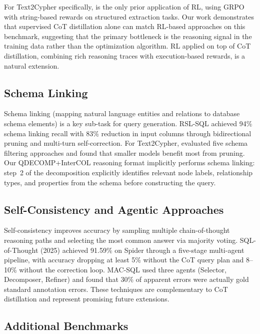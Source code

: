 \documentclass[11pt]{article}
\begin{document}
For Text2Cypher specifically, \citet{tran2025refining} is the only prior application of RL, using GRPO with string-based rewards on structured extraction tasks. Our work demonstrates that supervised CoT distillation alone can match RL-based approaches on this benchmark, suggesting that the primary bottleneck is the reasoning signal in the training data rather than the optimization algorithm. RL applied on top of CoT distillation, combining rich reasoning traces with execution-based rewards, is a natural extension.

\subsection{Schema Linking}

Schema linking (mapping natural language entities and relations to database schema elements) is a key sub-task for query generation. RSL-SQL \citep{rslsql2024} achieved 94\% schema linking recall with 83\% reduction in input columns through bidirectional pruning and multi-turn self-correction. For Text2Cypher, \citet{ozsoy2025schema} evaluated five schema filtering approaches and found that smaller models benefit most from pruning. Our QDECOMP+InterCOL reasoning format implicitly performs schema linking: step~2 of the decomposition explicitly identifies relevant node labels, relationship types, and properties from the schema before constructing the query.

\subsection{Self-Consistency and Agentic Approaches}

Self-consistency \citep{wang2022selfconsistency} improves accuracy by sampling multiple chain-of-thought reasoning paths and selecting the most common answer via majority voting. SQL-of-Thought (2025) achieved 91.59\% on Spider through a five-stage multi-agent pipeline, with accuracy dropping at least 5\% without the CoT query plan and 8--10\% without the correction loop. MAC-SQL \citep{macsql2025} used three agents (Selector, Decomposer, Refiner) and found that 30\% of apparent errors were actually gold standard annotation errors. These techniques are complementary to CoT distillation and represent promising future extensions.

\subsection{Additional Benchmarks}
\end{document}
